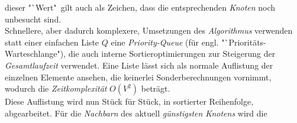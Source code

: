 \documentclass[12pt]{article}
\begin{document}
dieser "`Wert"\ gilt auch als Zeichen, dass die entsprechenden \textit{Knoten} noch unbesucht sind.
\\
Schnellere, aber dadurch komplexere, Umsetzungen des \textit{Algorithmus} verwenden statt einer einfachen Liste $Q$ eine \textit{Priority-Queue} (für engl. "`Prioritäts-Warteschlange"), die auch interne Sortieroptimierungen zur Steigerung der \textit{Gesamtlaufzeit} verwendet. Eine Liste lässt sich als normale Auflistung der einzelnen Elemente ansehen, die keinerlei Sonderberechnungen vornimmt, wodurch die \textit{Zeitkomplexität} $O(V^2)$ beträgt. 
\\
Diese Auflistung wird nun Stück für Stück, in sortierter Reihenfolge, abgearbeitet. Für die \textit{Nachbarn} des aktuell \textit{günstigsten Knotens} wird die
\end{document}
